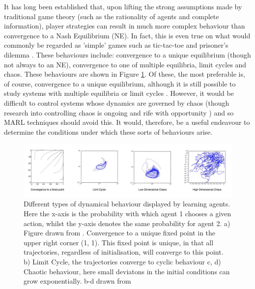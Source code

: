 \documentclass[letterpaper]{article} %
\begin{document}
    It has long been established  that, upon lifting the strong
    assumptions made by traditional game theory (such as the
    rationality of agents and complete information), player
    strategies can result in much more complex behaviour than
    convergence to a Nash Equilibrium (NE). In fact, this is even true
    on what would commonly be regarded as 'simple' games such as
    tic-tac-toe and prisoner's dilemma \cite{Galla2011,
      Sato2002}. These behaviours include: convergence to a unique
    equilibrium (though not always to an NE), convergence to one of
    multiple equilibria, limit cycles and chaos. These behaviours are
    shown in Figure \ref{fig::DynamicalBehaviours}. Of these, the most
    preferable is, of course, convergence to a unique equilibrium,
    although it is still possible to study systems with multiple
    equilibria or limit cycles \cite{Strogatz2000}. However, it would
    be difficult to control systems whose dynamics are governed by
    chaos (though research into controlling chaos is ongoing and rife
    with opportunity \cite{Fradkov2009}) and so MARL techniques should
    avoid this. It would, therefore, be a useful endeavour to
    determine the conditions under which these sorts of behaviours
    arise.

    \begin{figure}[h]
        \centering
        \includegraphics[width=1.1\textwidth]{Figures/DynamicalBehaviours}
        \caption{ \label{fig::DynamicalBehaviours} Different types of dynamical behaviour
       displayed
        by learning agents. Here the x-axis is the probability with which agent 1 chooses a given action, whilst the y-axis denotes the same probability for agent 2. a) Figure drawn from \cite{Tuyls2006AnGames}.
        Convergence
        to a unique fixed point in the upper right corner (1, 1). This fixed point is unique, in
        that all trajectories, regardless of initialisation, will converge to this point. b) Limit Cycle, the trajectories converge to cyclic behaviour c,
        d) Chaotic behaviour, here small deviatons in the initial conditions can grow
        exponentially. b-d drawn from \cite{Sanders2018}}
    \end{figure}
\end{document}

